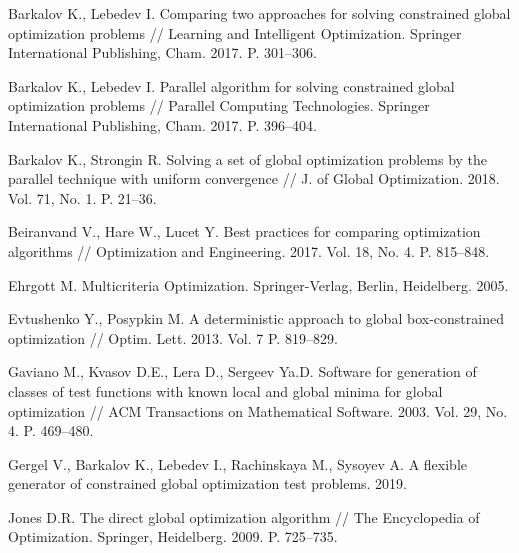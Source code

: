 \documentclass{cmi}
\begin{document}
\begin{biblio}
  Barkalov K., Lebedev I.
  \newblock Comparing two approaches for solving constrained global optimization
    problems
  \newblock // Learning and Intelligent Optimization. Springer International
    Publishing, Cham. 2017. P. 301--306.
  \newblock {}

  Barkalov K., Lebedev I.
  \newblock Parallel algorithm for solving constrained global optimization
    problems
  \newblock // Parallel Computing Technologies. Springer International
    Publishing, Cham. 2017. P. 396--404.
  \newblock {}

  Barkalov K., Strongin R.
  \newblock Solving a set of global optimization problems by the parallel
    technique with uniform convergence //
  \newblock J. of Global Optimization. 2018. Vol. 71, No. 1. P. 21--36.
  \newblock {}

  Beiranvand V., Hare W., Lucet Y.
  \newblock Best practices for comparing optimization algorithms //
  \newblock Optimization and Engineering. 2017. Vol. 18, No. 4. P. 815--848.
  \newblock {}

  Ehrgott M.
  \newblock Multicriteria Optimization.
  \newblock Springer-Verlag, Berlin, Heidelberg. 2005.
  \newblock {}

  Evtushenko Y., Posypkin M.
  \newblock A deterministic approach to global box-constrained optimization //
  \newblock Optim. Lett. 2013. Vol. 7 P. 819--829.
  \newblock {}

  {Gaviano M., Kvasov D.E., Lera D., Sergeev Ya.D.}
  \newblock Software for generation of classes of test functions with known local
    and global minima for global optimization //
  \newblock ACM Transactions on Mathematical Software. 2003. Vol. 29, No. 4. P.
    469--480.
  \newblock {}

  Gergel V., Barkalov K., Lebedev I., Rachinskaya M., Sysoyev A.
  \newblock A flexible generator of constrained global optimization test
    problems. 2019.
  \newblock {}

  {Jones D.R.}
  \newblock The direct global optimization algorithm
  \newblock // The Encyclopedia of Optimization. Springer, Heidelberg. 2009. P.
    725--735.
  \newblock {}


\end{biblio}
\end{document}
